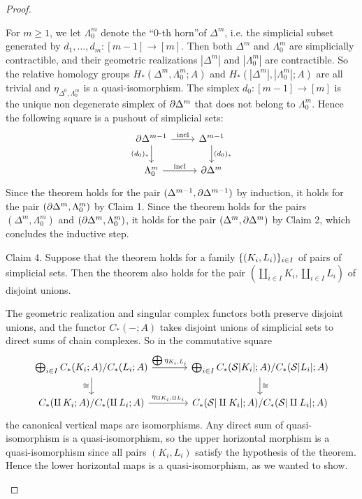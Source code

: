 \begin{proof}
\begin{claimproof}
For $m\ge1$, we let $\Lambda^m_0$ denote the \enquote{$0$-th horn}\alvaropls of $\Delta^m$, i.e. the simplicial subset generated by $d_1,\dots,d_m:[m-1]\to[m]$. Then both $\Delta^m$ and $\Lambda^m_0$ are simplicially contractible, and their geometric realizations $|\Delta^m|$ and $|\Lambda^m_0|$ are contractible. So the relative homology groups $H_*(\Delta^m,\Lambda^m_0;A)$ and $H_*(|\Delta^m|,|\Lambda^m_0|;A)$ are all trivial and $\eta_{\Delta^0,\Lambda^m_0}$ is a quasi-isomorphism. The simplex $d_0:[m-1]\to[m]$ is the unique non degenerate simplex of $\partial\Delta^m$ that does not belong to $\Lambda^m_0$. Hence the following square is a pushout of simplicial sets:
\[
\begin{tikzcd}
\de\Delta^{m-1} \ar[d,"(d_0)_*"'] \ar[r,"\incl"] & \Delta^{m-1} \ar[d,"(d_0)_*"]\\
\Lambda^m_0 \ar[r,"\incl"] & \de\Delta^m
\end{tikzcd}
\]
Since the theorem holds for the pair $(\Delta^{m-1},\partial\Delta^{m-1})$ by induction, it holds for the pair $(\partial\Delta^m,\Lambda^m_0)$ by Claim 1. Since the theorem holds for the pairs $(\Delta^m,\Lambda^m_0)$ and $(\partial\Delta^m,\Lambda^m_0)$, it holds for the pair $(\Delta^m,\partial\Delta^m)$ by Claim 2, which concludes the inductive step.
\end{claimproof}

Claim 4. Suppose that the theorem holds for a family $\{(K_i,L_i)\}_{i\in I}$ of pairs of simplicial sets. Then the theorem also holds for the pair $(\amalg_{i\in I}K_i,\amalg_{i\in I}L_i)$ of disjoint unions.

\begin{claimproof}
The geometric realization and singular complex functors both preserve disjoint unions, and the functor $C_*(-;A)$ takes disjoint unions of simplicial sets to direct sums of chain complexes. So in the commutative square
\[
\begin{tikzcd}[column sep=large]
\bigoplus_{i\in I} C_*(K_i;A)/C_*(L_i;A) \ar[d,"\cong"'] \ar[r,"\bigoplus\eta_{K_i,L_i}"] & \bigoplus_{i\in I} C_*(\S|K_i|;A)/C_*(\S|L_i|;A) \ar[d,"\cong"]\\
C_*(\amalg\,K_i;A)/C_*(\amalg\, L_i;A) \ar[r,"\eta_{\amalg K_i,\amalg L_i}"] & C_*(\S|\amalg K_i|;A)/C_*(\S|\amalg L_i|;A)
\end{tikzcd}
\]
the canonical vertical maps are isomorphisms. Any direct sum of quasi-isomorphism is a quasi-isomorphism, so the upper horizontal morphism is a quasi-isomorphism since all pairs $(K_i,L_i)$ satisfy the hypothesis of the theorem. Hence the lower horizontal maps is a quasi-isomorphism, as we wanted to show.
\end{claimproof}

\end{proof}
